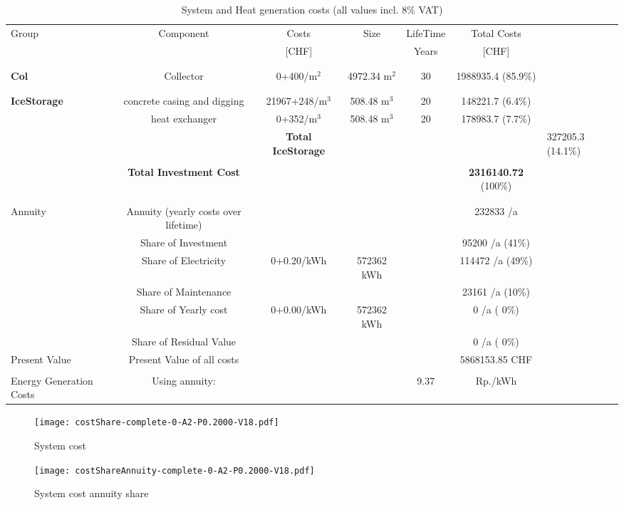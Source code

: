\documentclass[english]{SPFShortReport}
\begin{document}
\begin{table}[!ht]
\centering
\caption{System and Heat generation costs (all values incl. 8$\%$ VAT) }
\begin{adjustbox}{max width =\textwidth}
\begin{tabular}{l | c c c c c } 
\hline
\hline
Group &Component &Costs &Size &LifeTime &Total Costs \\ 
 & &[CHF] & &Years &[CHF]\\ 
\hline
\\
\hline \\
\textbf{Col} & Collector & 0+400/m$^2$ & 4972.34 m$^2$ & 30 & 1988935.4 (85.9\%) \\
\hline \\
\hline \\
\textbf{IceStorage} & concrete casing and digging & 21967+248/m$^3$ & 508.48 m$^3$ & 20 & 148221.7 (6.4\%) \\
 & heat exchanger & 0+352/m$^3$ & 508.48 m$^3$ & 20 & 178983.7 (7.7\%) \\
&
 & \textbf{Total IceStorage} & & & & 327205.3 (14.1\%) \\
\hline \\
 & \textbf{Total Investment Cost} & & & & \textbf{2316140.72} (100\%) \\ 
\hline \\ 
\hline \\ 
Annuity & Annuity (yearly costs over lifetime)  &&& & 232833 /a  \\
 & Share of Investment & &&& 95200 /a (41\%) \\
 & Share of Electricity & 0+0.20/kWh & 572362 kWh &  & 114472 /a (49\%)\\
 & Share of Maintenance & &&& 23161 /a (10\%)\\ 
 & Share of Yearly cost & 0+0.00/kWh & 572362 kWh & &  0 /a ( 0\%)\\
 & Share of Residual Value &&& &  0 /a ( 0\%)\\
Present Value  & Present Value of all costs  & &&& 5868153.85 CHF \\
\hline \\ 
 Energy Generation Costs & Using annuity: &&& 9.37 & Rp./kWh \\
\hline
\hline
\end{tabular}
\end{adjustbox}
\label{CostsTable}
\end{table}
\begin{figure}[!htbp]
\begin{center}
\texttt{[image: costShare-complete-0-A2-P0.2000-V18.pdf]}
\caption{System cost}
\label{systemCost}
\end{center}
\end{figure}
\begin{figure}[!htbp]
\begin{center}
\texttt{[image: costShareAnnuity-complete-0-A2-P0.2000-V18.pdf]}
\caption{System cost annuity share}
\label{systemCostannuity}
\end{center}
\end{figure}
\end{document}
